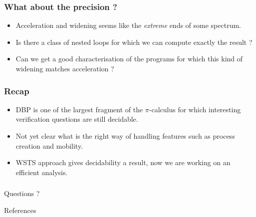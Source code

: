 \documentclass{beamer}
\begin{document}
\begin{frame}
  \frametitle{What about the precision ?}

  \begin{itemize}
  \item Acceleration and widening seems like the \emph{extreme} ends of some spectrum.
  \item Is there a class of nested loops for which we can compute exactly the result ?
  \item Can we get a good characterisation of the programs for which this kind of widening matches acceleration ?
  \end{itemize}

\end{frame}

\begin{frame}
  \frametitle{Recap}

  \begin{itemize}
  \item DBP is one of the largest fragment of the $\pi$-calculus for which interesting verification questions are still decidable.
  \item Not yet clear what is the right way of handling features such as process creation and mobility.
  \item WSTS approach gives decidability a result, now we are working on an efficient analysis.
  \end{itemize}

\end{frame}

\begin{frame}
  \frametitle{}
  \begin{center}
  {\Large Questions ?}
  \end{center}
\end{frame}

\begin{frame}[allowframebreaks]{References}
  \frametitle{}
  {\tiny
  
  
  }
\end{frame}
\end{document}
